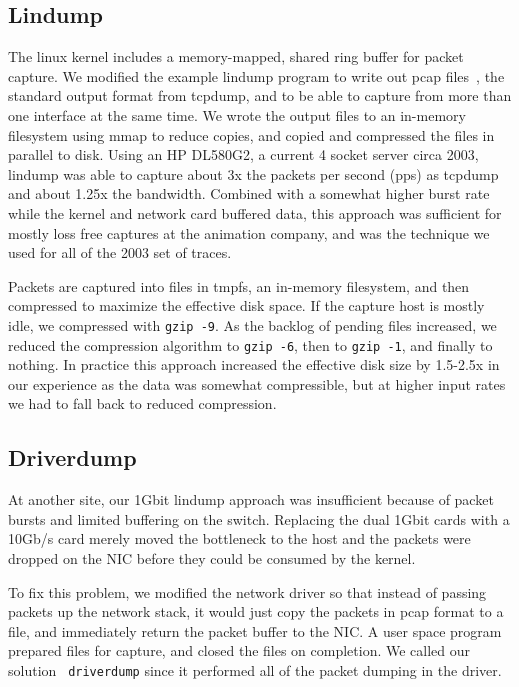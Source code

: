 \subsection{Lindump}

The linux kernel includes a memory-mapped, shared ring buffer for
packet capture.  We modified the example lindump program to write out
pcap files~\cite{pcap}, the standard output format from tcpdump, and
to be able to capture from more than one interface at the same time.
We wrote the output files to an in-memory filesystem using mmap to
reduce copies, and copied and compressed the files in parallel to
disk.  Using an HP DL580G2, a current 4 socket server circa 2003,
lindump was able to capture about 3x the packets per second (pps) as
tcpdump and about 1.25x the bandwidth.  Combined with a somewhat
higher burst rate while the kernel and network card buffered data,
this approach was sufficient for mostly loss free captures at the animation
company, and was the technique we used for all of the 2003 set of
traces.

Packets are captured into files in tmpfs, an in-memory filesystem, and then compressed
to maximize the effective disk space.  If the capture host is mostly
idle, we compressed with {\tt gzip -9}. As the backlog of pending
files increased, we reduced the compression algorithm to {\tt gzip
-6}, then to {\tt gzip -1}, and finally to nothing.  In practice this
approach increased the effective disk size by 1.5-2.5x in our
experience as the data was somewhat compressible, but at higher input
rates we had to fall back to reduced compression.

\subsection{Driverdump}

At another site, our 1Gbit lindump approach was insufficient because
of packet bursts and limited buffering on the switch.  Replacing the
dual 1Gbit cards with a 10Gb/s card merely moved the bottleneck to the
host and the packets were dropped on the NIC before they could be
consumed by the kernel.

To fix this problem, we modified the network driver so that instead of
passing packets up the network stack, it would just copy the packets
in pcap format to a file, and immediately return the packet
buffer to the NIC.  A user space program prepared files for capture,
and closed the files on completion.  We called our solution {\tt
driverdump} since it performed all of the packet dumping in the
driver.

